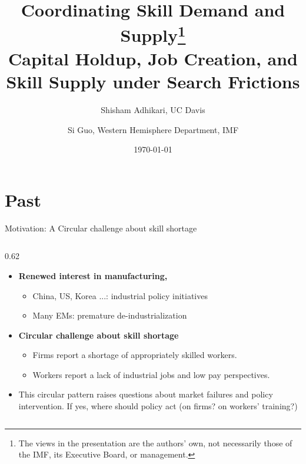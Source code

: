 \documentclass[9pt,xcolor={svgnames}]{beamer}
\title[Bridging the Manufacturing Gap]{\large \textbf{Coordinating Skill Demand and Supply\footnote{The views in the presentation are the authors' own, not necessarily those of the IMF, its Executive Board, or management.}\\ \normalsize Capital Holdup, Job Creation, and Skill Supply under Search Frictions
}
}
\author{Shisham Adhikari, UC Davis \\  %
\vspace{3mm}
\and Si Guo, Western Hemisphere Department,  IMF}    %
\date[Davis]{%
  \today
}
\begin{document}
\begin{frame}
\titlepage %
\end{frame}



\section{Past} 
\begin{frame}{Motivation: A Circular challenge about skill shortage}\label{main:intro}

\setlength{\columnsep}{8pt}

\begin{columns}[T,onlytextwidth]
\begin{column}{0.62\textwidth}
 \begin{itemize}

  \item \textbf{Renewed interest in  manufacturing,} 
    \begin{itemize}
        \item China, US, Korea ...: industrial policy initiatives
        \item Many EMs: premature de-industrialization
    \end{itemize}

\vspace{2mm}
 
    \item \textbf{Circular challenge about skill shortage} 
    \begin{itemize}
        \item Firms report a shortage of appropriately skilled workers. \hyperlink{app:media}{}

        \item Workers report a lack of industrial jobs and low pay perspectives. \hyperlink{app:jobshort}{}

    \end{itemize}
    
    \vspace{4mm}

    \item This circular pattern raises questions about market failures and policy intervention. If yes, where should policy act (on firms? on workers' training?)
    

\end{itemize}
\end{column}
\end{columns}
\end{frame}
\end{document}
